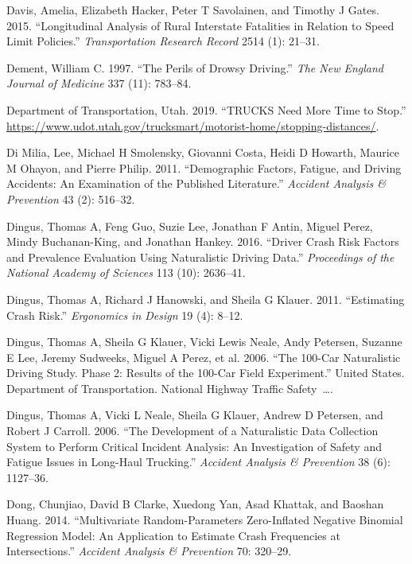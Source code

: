 \documentclass[12pt]{book}
\numberwithin{equation}{chapter}
\begin{document}
\leavevmode\hypertarget{ref-davis2015longitudinal}{}%
Davis, Amelia, Elizabeth Hacker, Peter T Savolainen, and Timothy J Gates. 2015. ``Longitudinal Analysis of Rural Interstate Fatalities in Relation to Speed Limit Policies.'' \emph{Transportation Research Record} 2514 (1): 21--31.

\leavevmode\hypertarget{ref-dement1997perils}{}%
Dement, William C. 1997. ``The Perils of Drowsy Driving.'' \emph{The New England Journal of Medicine} 337 (11): 783--84.

\leavevmode\hypertarget{ref-utah2019}{}%
Department of Transportation, Utah. 2019. ``TRUCKS Need More Time to Stop.'' \url{https://www.udot.utah.gov/trucksmart/motorist-home/stopping-distances/}.

\leavevmode\hypertarget{ref-di2011demographic}{}%
Di Milia, Lee, Michael H Smolensky, Giovanni Costa, Heidi D Howarth, Maurice M Ohayon, and Pierre Philip. 2011. ``Demographic Factors, Fatigue, and Driving Accidents: An Examination of the Published Literature.'' \emph{Accident Analysis \& Prevention} 43 (2): 516--32.

\leavevmode\hypertarget{ref-dingus2016driver}{}%
Dingus, Thomas A, Feng Guo, Suzie Lee, Jonathan F Antin, Miguel Perez, Mindy Buchanan-King, and Jonathan Hankey. 2016. ``Driver Crash Risk Factors and Prevalence Evaluation Using Naturalistic Driving Data.'' \emph{Proceedings of the National Academy of Sciences} 113 (10): 2636--41.

\leavevmode\hypertarget{ref-dingus2011estimating}{}%
Dingus, Thomas A, Richard J Hanowski, and Sheila G Klauer. 2011. ``Estimating Crash Risk.'' \emph{Ergonomics in Design} 19 (4): 8--12.

\leavevmode\hypertarget{ref-dingus2006100}{}%
Dingus, Thomas A, Sheila G Klauer, Vicki Lewis Neale, Andy Petersen, Suzanne E Lee, Jeremy Sudweeks, Miguel A Perez, et al. 2006. ``The 100-Car Naturalistic Driving Study. Phase 2: Results of the 100-Car Field Experiment.'' United States. Department of Transportation. National Highway Traffic Safety~\ldots{}.

\leavevmode\hypertarget{ref-dingus2006development}{}%
Dingus, Thomas A, Vicki L Neale, Sheila G Klauer, Andrew D Petersen, and Robert J Carroll. 2006. ``The Development of a Naturalistic Data Collection System to Perform Critical Incident Analysis: An Investigation of Safety and Fatigue Issues in Long-Haul Trucking.'' \emph{Accident Analysis \& Prevention} 38 (6): 1127--36.

\leavevmode\hypertarget{ref-dong2014multivariate}{}%
Dong, Chunjiao, David B Clarke, Xuedong Yan, Asad Khattak, and Baoshan Huang. 2014. ``Multivariate Random-Parameters Zero-Inflated Negative Binomial Regression Model: An Application to Estimate Crash Frequencies at Intersections.'' \emph{Accident Analysis \& Prevention} 70: 320--29.
\end{document}
